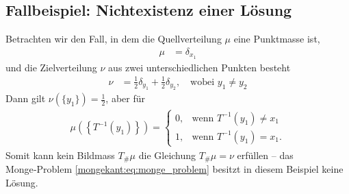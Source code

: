 \subsection{Fallbeispiel: Nichtexistenz einer Lösung%
\label{mongekant:subsection:monge_inexistence}}
Betrachten wir den Fall,
in dem die Quellverteilung $\mu$ eine Punktmasse ist,
\begin{align*}
\mu
&=
\delta_{x_1}
\end{align*}
und die Zielverteilung $\nu$ aus zwei unterschiedlichen Punkten besteht
\begin{align*}
\nu
&=
\frac{1}{2} \delta_{y_1} + \frac{1}{2} \delta_{y_2}
,\quad
\text{wobei } y_1 \neq y_2
\end{align*}
Dann gilt $\nu(\{y_1\}) = \frac{1}{2}$,
aber für
\begin{align*}
\mu\left(\left\{T^{-1}(y_1)\right\}\right)
=
\begin{cases}
0,
&\text{wenn }
T^{-1}(y_1)
\neq
x_1
\\
1,
&\text{wenn }
T^{-1}(y_1)
=
x_1
.
\end{cases}
\end{align*}
Somit kann kein Bildmass $T_{\#}\mu$ die Gleichung $T_{\#}\mu=\nu$ erfüllen --
das Monge‑Problem \eqref{mongekant:eq:monge_problem} besitzt in diesem Beispiel keine Lösung.


